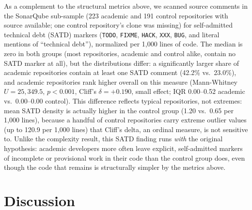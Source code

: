 \documentclass{cleiej}
\begin{document}
As a complement to the structural metrics above, we scanned source comments in the SonarQube sub-sample (223 academic and 191 control repositories with source available; one control repository's clone was missing) for self-admitted technical debt (SATD) markers (\texttt{TODO}, \texttt{FIXME}, \texttt{HACK}, \texttt{XXX}, \texttt{BUG}, and literal mentions of ``technical debt''), normalized per 1,000 lines of code. The median is zero in both groups (most repositories, academic and control alike, contain no SATD marker at all), but the distributions differ: a significantly larger share of academic repositories contain at least one SATD comment (42.2\% vs.\ 23.0\%), and academic repositories rank higher overall on this measure (Mann-Whitney $U=25{,}349.5$, $p<0.001$, Cliff's $\delta=+0.190$, small effect; IQR 0.00--0.52 academic vs.\ 0.00--0.00 control). This difference reflects typical repositories, not extremes: mean SATD density is actually higher in the control group (1.20 vs.\ 0.65 per 1,000 lines), because a handful of control repositories carry extreme outlier values (up to 120.9 per 1,000 lines) that Cliff's delta, an ordinal measure, is not sensitive to. Unlike the complexity result, this SATD finding runs \emph{with} the original hypothesis: academic developers more often leave explicit, self-admitted markers of incomplete or provisional work in their code than the control group does, even though the code that remains is structurally simpler by the metrics above.

\section{Discussion}
\end{document}
